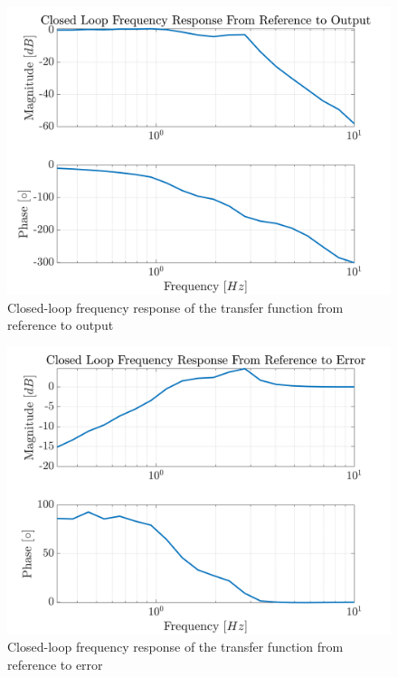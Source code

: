 \documentclass[11pt]{article}
\begin{document}



\begin{figure}[!ht]
\centering
\includegraphics[width=\textwidth]{CLFreqResp.png}
\caption{Closed-loop frequency response of the transfer function from reference to output}
\label{fig:CLFreqResponse}
\end{figure}




\begin{figure}[!ht]
\centering
\includegraphics[width=\textwidth]{CLFreqRespError.png}
\caption{Closed-loop frequency response of the transfer function from reference to error}
\label{fig:CLFreqResponseError}
\end{figure}
\end{document}
